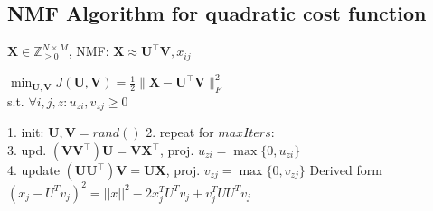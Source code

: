 \subsection*{NMF Algorithm for quadratic cost function}
$\mathbf{X} \in \mathbb{Z}^{N \times M}_{\geq 0}$, NMF: $\mathbf{X} \approx \mathbf{U^\top V}, x_{ij}$

$\min_{\mathbf{U}, \mathbf{V}} J(\mathbf{U}, \mathbf{V}) = \frac{1}{2} \|\mathbf{X} - \mathbf{U}^\top\mathbf{V}\|_F^2$\\
s.t. $\forall i,j,z:u_{zi},v_{zj} \geq 0 $


1. init: $\mathbf{U}, \mathbf{V} = rand()$ 2. repeat for $\mathit{maxIters}$:\\
3. upd. $(\mathbf{VV}^\top)\mathbf{U} = \mathbf{VX}^\top$, proj. $u_{zi} = \max \{ 0, u_{zi} \}$\\
4. update $(\mathbf{UU}^\top)\mathbf{V} = \mathbf{UX}$, proj. $v_{zj} = \max \{ 0, v_{zj} \}$
Derived form $(x_j - U^Tv_j)^2 = ||x||^2 - 2x_j^TU^Tv_j + v_j^TUU^Tv_j$
